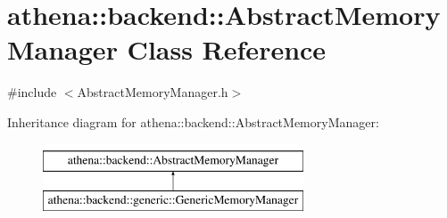 \hypertarget{classathena_1_1backend_1_1_abstract_memory_manager}{}\section{athena\+:\+:backend\+:\+:Abstract\+Memory\+Manager Class Reference}
\label{classathena_1_1backend_1_1_abstract_memory_manager}


{\ttfamily \#include $<$Abstract\+Memory\+Manager.\+h$>$}

Inheritance diagram for athena\+:\+:backend\+:\+:Abstract\+Memory\+Manager\+:\begin{figure}[H]
\begin{center}
\leavevmode
\includegraphics[height=2.000000cm]{classathena_1_1backend_1_1_abstract_memory_manager}
\end{center}
\end{figure}
